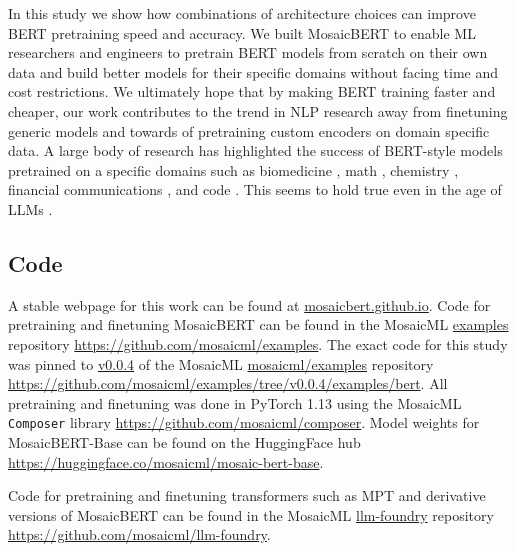 \documentclass{article}
\begin{document}
In this study we show how combinations of architecture choices can improve BERT pretraining speed and accuracy.
We built MosaicBERT to enable ML researchers and engineers to pretrain BERT models from scratch on their own data and build better models for their specific domains without facing time and cost restrictions. We ultimately hope that by making BERT training faster and cheaper, our work contributes to the trend in NLP research away from finetuning generic models and towards of pretraining custom encoders on domain specific data.
A large body of research has highlighted the success of BERT-style models pretrained on a specific domains  such as biomedicine \citep{beltagy2019scibert,lee2020biobert,gu2021domain,el2022re}, math \citep{shen2021mathbert}, chemistry \citep{bai2021pre,horawalavithana2022foundation}, financial communications \citep{shah2022flue}, and code \citep{tabassum2020code}. This seems to hold true even in the age of LLMs \citep{bioMedLM,wu2023bloomberggpt}.

\subsection*{Code}
A stable webpage for this work can be found at \href{https://mosaicbert.github.io}{\url{mosaicbert.github.io}}. Code for pretraining and finetuning MosaicBERT can be found in the MosaicML \url{examples} repository \href{https://github.com/mosaicml/examples}{\url{https://github.com/mosaicml/examples}}. The exact code for this study was pinned to \url{v0.0.4} of the MosaicML \url{mosaicml/examples} repository \href{https://github.com/mosaicml/examples/tree/v0.0.4/examples/bert}{\url{https://github.com/mosaicml/examples/tree/v0.0.4/examples/bert}}. 
All pretraining and finetuning was done in PyTorch 1.13 using the MosaicML \texttt{Composer} library \href{https://github.com/mosaicml/composer}{\url{https://github.com/mosaicml/composer}}. 
Model weights for MosaicBERT-Base can be found on the HuggingFace hub \href{https://huggingface.co/mosaicml/mosaic-bert-base}{\url{https://huggingface.co/mosaicml/mosaic-bert-base}}.

Code for pretraining and finetuning transformers such as MPT and derivative versions of MosaicBERT can be found in the MosaicML \url{llm-foundry} repository \href{https://github.com/mosaicml/llm-foundry}{\url{https://github.com/mosaicml/llm-foundry}}.
\end{document}
